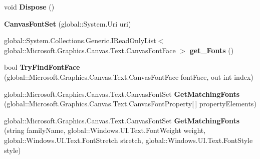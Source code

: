 \begin{DoxyCompactItemize}
void {\bfseries Dispose} ()
\item 
\mbox{\label{class_microsoft_1_1_graphics_1_1_canvas_1_1_text_1_1_canvas_font_set_a1113ba1353deb4c7fe0e1a7dc51973da}} 
{\bfseries Canvas\+Font\+Set} (global\+::\+System.\+Uri uri)
\item 
\mbox{\label{class_microsoft_1_1_graphics_1_1_canvas_1_1_text_1_1_canvas_font_set_aefa89c8fcefa001d0d56c7165ffb79ac}} 
global\+::\+System.\+Collections.\+Generic.\+I\+Read\+Only\+List$<$ global\+::\+Microsoft.\+Graphics.\+Canvas.\+Text.\+Canvas\+Font\+Face $>$ {\bfseries get\+\_\+\+Fonts} ()
\item 
\mbox{\label{class_microsoft_1_1_graphics_1_1_canvas_1_1_text_1_1_canvas_font_set_a13e365d13ed355de227da7a3145714db}} 
bool {\bfseries Try\+Find\+Font\+Face} (global\+::\+Microsoft.\+Graphics.\+Canvas.\+Text.\+Canvas\+Font\+Face font\+Face, out int index)
\item 
\mbox{\label{class_microsoft_1_1_graphics_1_1_canvas_1_1_text_1_1_canvas_font_set_a4a5e120b147d6554e916b380746b72a5}} 
global\+::\+Microsoft.\+Graphics.\+Canvas.\+Text.\+Canvas\+Font\+Set {\bfseries Get\+Matching\+Fonts} (global\+::\+Microsoft.\+Graphics.\+Canvas.\+Text.\+Canvas\+Font\+Property\mbox{[}$\,$\mbox{]} property\+Elements)
\item 
\mbox{\label{class_microsoft_1_1_graphics_1_1_canvas_1_1_text_1_1_canvas_font_set_a1e65e79bf7c6294505e0162beef419fd}} 
global\+::\+Microsoft.\+Graphics.\+Canvas.\+Text.\+Canvas\+Font\+Set {\bfseries Get\+Matching\+Fonts} (string family\+Name, global\+::\+Windows.\+U\+I.\+Text.\+Font\+Weight weight, global\+::\+Windows.\+U\+I.\+Text.\+Font\+Stretch stretch, global\+::\+Windows.\+U\+I.\+Text.\+Font\+Style style)
\item 
\mbox{\label{class_microsoft_1_1_graphics_1_1_canvas_1_1_text_1_1_canvas_font_set_a1b220e58fc624526327b3d8faccceecf}} 

\end{DoxyCompactItemize}
